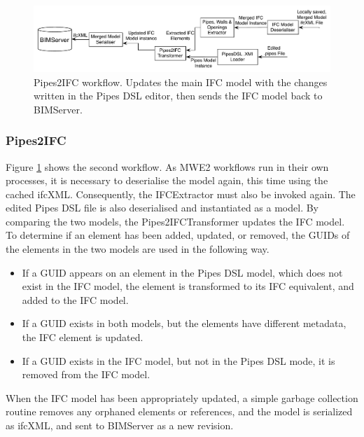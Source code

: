\begin{figure}[t]
    \centering
        \includegraphics[width=120mm]{images/Pipes2IFC.pdf}
    \caption{Pipes2IFC workflow. Updates the main IFC model with the changes written in the Pipes DSL editor, then sends the IFC model back to BIMServer.}
    \label{fig:Pipes2IFCWorkflow}
\end{figure}
\subsubsection{Pipes2IFC}
Figure \ref{fig:Pipes2IFCWorkflow} shows the second workflow. As MWE2 workflows run in their own processes, it is necessary to deserialise the model again, this time using the cached ifcXML. Consequently, the IFCExtractor must also be invoked again. The edited Pipes DSL file is also deserialised and instantiated as a model. By comparing the two models, the Pipes2IFCTransformer updates the IFC model. To determine if an element has been added, updated, or removed, the GUIDs of the elements in the two models are used in the following way.
\begin{itemize}
\item If a GUID appears on an element in the Pipes DSL model, which does not exist in the IFC model, the element is transformed to its IFC equivalent, and added to the IFC model.
\item If a GUID exists in both models, but the elements have different metadata, the IFC element is updated.
\item If a GUID exists in the IFC model, but not in the Pipes DSL mode, it is removed from the IFC model.
\end{itemize}
When the IFC model has been appropriately updated, a simple garbage collection routine removes any orphaned elements or references, and the model is serialized as ifcXML, and sent to BIMServer as a new revision.
